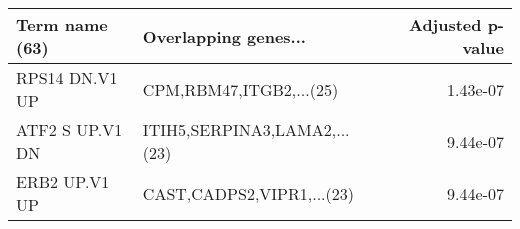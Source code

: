 \begin{tabular}{llr}
\toprule
 Term name (63) &         Overlapping genes... &  Adjusted p-value \\
\midrule
 RPS14 DN.V1 UP &      CPM,RBM47,ITGB2,...(25) &          1.43e-07 \\
ATF2 S UP.V1 DN & ITIH5,SERPINA3,LAMA2,...(23) &          9.44e-07 \\
  ERB2 UP.V1 UP &    CAST,CADPS2,VIPR1,...(23) &          9.44e-07 \\
\bottomrule
\end{tabular}
